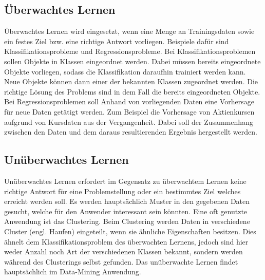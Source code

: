 \subsection{Überwachtes Lernen}
\label{subsec:ueberwachtesLernen}
Überwachtes Lernen wird eingesetzt, wenn eine Menge an Trainingsdaten sowie ein festes Ziel bzw. eine richtige Antwort vorliegen. Beispiele dafür sind Klassifikationsprobleme und Regressionsprobleme.
Bei Klassifikationsproblemen sollen Objekte in Klassen eingeordnet werden. Dabei müssen bereits eingeordnete Objekte vorliegen, sodass die Klassifikation daraufhin trainiert werden kann. Neue Objekte können dann einer der bekannten Klassen zugeordnet werden. Die richtige Lösung des Problems sind in dem Fall die bereits eingeordneten Objekte.
Bei Regressionsproblemen soll Anhand von vorliegenden Daten eine Vorhersage für neue Daten getätigt werden. Zum Beispiel die Vorhersage von Aktienkursen aufgrund von Kursdaten aus der Vergangenheit. Dabei soll der Zusammenhang zwischen den Daten und dem daraus resultierenden Ergebnis hergestellt werden.

\subsection{Unüberwachtes Lernen}
\label{subsec:unueberwachtesLernen}
Unüberwachtes Lernen erfordert im Gegensatz zu überwachtem Lernen keine richtige Antwort für eine Problemstellung oder ein bestimmtes Ziel welches erreicht werden soll. Es werden hauptsächlich Muster in den gegebenen Daten gesucht, welche für den Anwender interessant sein könnten. Eine oft genutzte Anwendung ist das Clustering. Beim Clustering werden Daten in verschiedene Cluster (engl. Haufen) eingeteilt, wenn sie ähnliche Eigenschaften besitzen. Dies ähnelt dem Klassifikationsproblem des überwachten Lernens, jedoch sind hier weder Anzahl noch Art der verschiedenen Klassen bekannt, sondern werden während des Clusterings selbst gefunden.
Das unüberwachte Lernen findet hauptsächlich im Data-Mining Anwendung.

